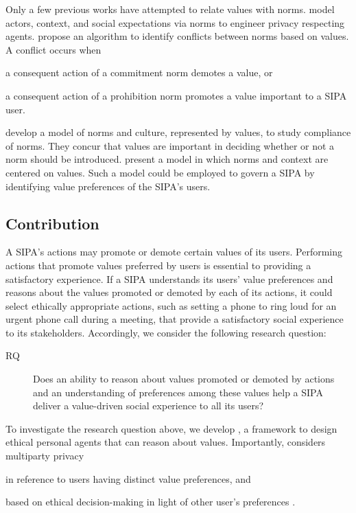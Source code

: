Only a few previous works have attempted to relate values with norms.
\citet{Murukannaiah-IC16-Engineering} model actors, context, and social expectations via norms to engineer privacy respecting agents. 
\citet{DaSilvaFigueiredo-COIN13} propose an algorithm to identify conflicts between norms based on values. 
A conflict occurs when
\begin{enumerate*}[label=(\arabic*)]
\item a consequent action of a commitment norm demotes a value, or
\item a consequent action of a prohibition norm promotes a value important to a SIPA user.
\end{enumerate*}
%
\citet{Dechesne-AIL13-Norms+Values} develop a model of norms and culture,
represented by values, to study compliance of norms. They concur that
values are important in deciding whether or not a norm should be
introduced. \citet{kayal13coin} present a model in which norms and 
context are centered on values. Such a model could be employed
to govern a SIPA by identifying value preferences of the SIPA's
users.

\subsection{Contribution}
A SIPA's actions may promote or demote certain values of its users. 
Performing actions that promote values preferred by users is essential to providing a satisfactory experience. 
%
If a SIPA understands its users' value preferences and reasons about the values promoted or demoted by each of its actions, it could select ethically appropriate actions, such as setting a phone to ring loud for an urgent phone call during a meeting, that provide a satisfactory social experience to its stakeholders.
% 
Accordingly, we consider the following research question: 

\begin{description}
\item[RQ] Does an ability to reason about values promoted or demoted by actions and an understanding of preferences among these values help a SIPA deliver a value-driven social experience to all its users? 
\end{description}

To investigate the research question above, we develop \frameworkAinur, a
framework to design ethical personal agents that can reason about values.
Importantly, \frameworkAinur considers multiparty privacy 
\begin{enumerate*}[label=(\arabic*)]
\item in reference to users having distinct value preferences, and 
\item based on ethical decision-making in light of other user's preferences \citep{TOCHI-17:Multiuser}.
\end{enumerate*} 


